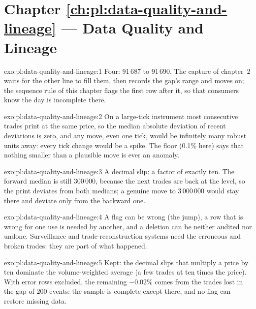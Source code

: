 \section*{Chapter \ref{ch:pl:data-quality-and-lineage} --- Data Quality and Lineage}

\begin{solution}{exo:pl:data-quality-and-lineage:1}
Four: 91\,687 to 91\,690. The capture of chapter~2 waits for the other line to fill them, then records the gap's range and moves
on; the sequence rule of this chapter flags the first row after it, so that consumers know the day is incomplete there.
\end{solution}

\begin{solution}{exo:pl:data-quality-and-lineage:2}
On a large-tick instrument most consecutive trades print at the same price, so the median absolute deviation of recent deviations is
zero, and any move, even one tick, would be infinitely many robust units away: every tick change would be a spike. The floor (0.1\%
here) says that nothing smaller than a plausible move is ever an anomaly.
\end{solution}

\begin{solution}{exo:pl:data-quality-and-lineage:3}
A decimal slip: a factor of exactly ten. The forward median is still 300\,000, because the next trades are back at the level, so the
print deviates from both medians; a genuine move to 3\,000\,000 would stay there and deviate only from the backward one.
\end{solution}

\begin{solution}{exo:pl:data-quality-and-lineage:4}
A flag can be wrong (the jump), a row that is wrong for one use is needed by another, and a deletion can be neither audited nor
undone. Surveillance and trade-reconstruction systems need the erroneous and broken trades: they are part of what happened.
\end{solution}

\begin{solution}{exo:pl:data-quality-and-lineage:5}
Kept: the decimal slips that multiply a price by ten dominate the volume-weighted average (a few trades at ten times the price). With
error rows excluded, the remaining $-0.02\%$ comes from the trades lost in the gap of 200 events: the sample is complete except there,
and no flag can restore missing data.
\end{solution}

